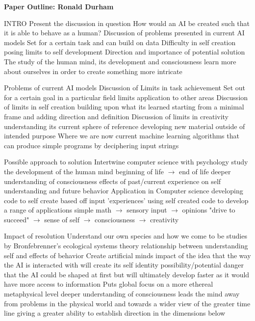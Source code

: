 \documentclass[11pt]{article}
\theoremstyle{plain}
\begin{document}
\large \textbf{Paper Outline: \hspace{75mm} Ronald Durham}\\
\begin{outline}[enumerate]
\1 INTRO
\2 Present the discussion in question
\3 How would an AI be created such that it is able to behave as a human?
\2 Discussion of problems presented in current AI models
\3 Set for a certain task and can build on data
\3 Difficulty in self creation posing limits to self development
\2 Direction and importance of potential solution
\3 The study of the human mind, its development and consciousness
\3 learn more about ourselves in order to create something more intricate

\1 Problems of current AI models
\2 Discussion of Limits in task achievement
\3 Set out for a certain goal in a particular field
\3 limits application to other areas
\2 Discussion of limits in self creation
\3 building upon what its learned
\3 starting from a minimal frame and adding direction and definition
\2 Discussion of limits in creativity
\3 understanding its current sphere of reference
\3 developing new material outside of intended purpose
\2 Where we are now
\3 current machine learning algorithms that can produce simple programs by deciphering input strings

\1 Possible approach to solution
\2 Intertwine computer science with psychology
\3 study the development of the human mind
\4 beginning of life $\rightarrow$ end of life
\3 deeper understanding of consciousness
\4 effects of past/current experience on self understanding and future behavior
\2 Application in Computer science
\3 developing code to self create based off input 'experiences'
\3 using self created code to develop a range of applications
\4 simple math $\rightarrow$ sensory input $\rightarrow$ opinions "drive to succeed" $\rightarrow$ sense of self $\rightarrow$ consciousness $\rightarrow$ creativity

\1 Impact of resolution
\2 Understand our own species and how we come to be
\3 studies by Bronfebrenner's ecological systems theory
\3 relationship between understanding self and effects of behavior
\2 Create artificial minds 
\3 impact of the idea that the way the AI is interacted with will create its self identity
\3 possibility/potential danger that the AI could be shaped at first but will ultimately develop faster as it would have more access to information
\2 Puts global focus on a more ethereal metaphysical level
\3 deeper understanding of consciousness leads the mind away from problems in the physical world and towards a wider view of the greater time line
\3 giving a greater ability to establish direction in the dimensions below


\end{outline}
\end{document}
